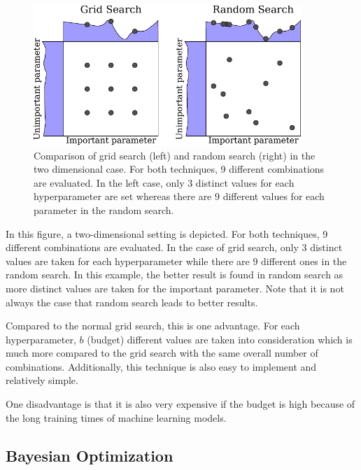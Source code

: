 \begin{figure}[H]
	\centering
	\includegraphics[width=0.9\textwidth]{figures/Fig_2_3_grid_random_search}
	\caption{Comparison of grid search (left) and random search (right) in the two dimensional case. For both techniques, 9 different combinations are evaluated. In the left case, only 3 distinct values for each hyperparameter are set whereas there are 9 different values for each parameter in the random search. }
	\label{fig:comparison_searches}
\end{figure}

In this figure, a two-dimensional setting is depicted. For both techniques, 9 different combinations are evaluated. In the case of grid search, only 3 distinct values are taken for each hyperparameter while there are 9 different ones in the random search. In this example, the better result is found in random search as more distinct values are taken for the important parameter. Note that it is not always the case that random search leads to better results.

Compared to the normal grid search, this is one advantage. For each hyperparameter, $ b $ (budget) different values are taken into consideration which is much more compared to the grid search with the same overall number of combinations. Additionally, this technique is also easy to implement and relatively simple. 

One disadvantage is that it is also very expensive if the budget is high because of the long training times of machine learning models. 


\subsection{Bayesian Optimization}

